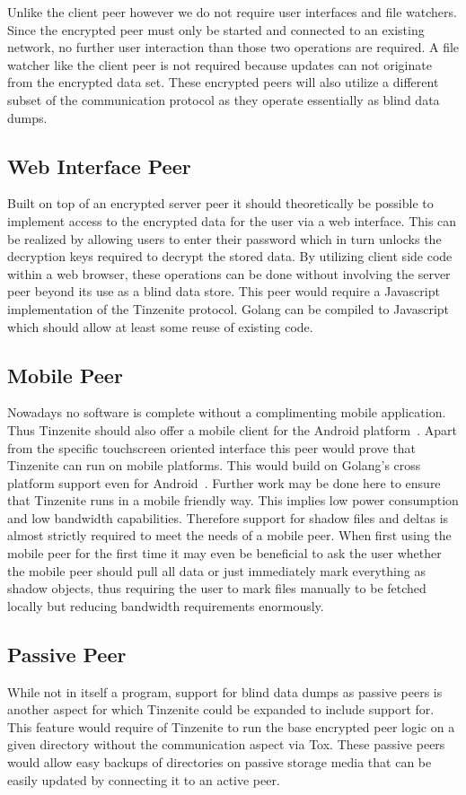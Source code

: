 Unlike the client peer however we do not require user interfaces and file watchers.
Since the encrypted peer must only be started and connected to an existing network, no further user interaction than those two operations are required.
A file watcher like the client peer is not required because updates can not originate from the encrypted data set.
These encrypted peers will also utilize a different subset of the communication protocol as they operate essentially as blind data dumps.

\subsection{Web Interface Peer}
\label{sub:Web Interface Peer}

Built on top of an encrypted server peer it should theoretically be possible to implement access to the encrypted data for the user via a web interface.
This can be realized by allowing users to enter their password which in turn unlocks the decryption keys required to decrypt the stored data.
By utilizing client side code within a web browser, these operations can be done without involving the server peer beyond its use as a blind data store.
This peer would require a Javascript implementation of the Tinzenite protocol.
Golang can be compiled to Javascript~\cite{web:site:github:gopherjs} which should allow at least some reuse of existing code.

\subsection{Mobile Peer}

Nowadays no software is complete without a complimenting mobile application.
Thus Tinzenite should also offer a mobile client for the Android platform~\cite{web:site:android}.
Apart from the specific touchscreen oriented interface this peer would prove that Tinzenite can run on mobile platforms.
This would build on Golang's cross platform support even for Android~\cite{web:site:golang:mobile}.
Further work may be done here to ensure that Tinzenite runs in a mobile friendly way.
This implies low power consumption and low bandwidth capabilities.
Therefore support for shadow files and deltas is almost strictly required to meet the needs of a mobile peer.
When first using the mobile peer for the first time it may even be beneficial to ask the user whether the mobile peer should pull all data or just immediately mark everything as shadow objects, thus requiring the user to mark files manually to be fetched locally but reducing bandwidth requirements enormously.

\subsection{Passive Peer}

While not in itself a program, support for blind data dumps as passive peers is another aspect for which Tinzenite could be expanded to include support for.
This feature would require of Tinzenite to run the base encrypted peer logic on a given directory without the communication aspect via Tox.
These passive peers would allow easy backups of directories on passive storage media that can be easily updated by connecting it to an active peer.
